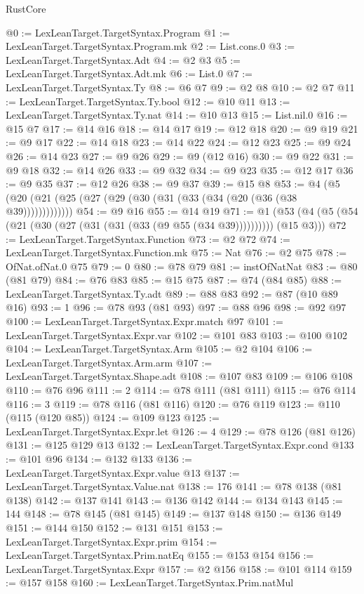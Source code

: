 \begin{lexlean}{RustCore}
\begin{coremodule}
@0 := LexLeanTarget.TargetSyntax.Program
@1 := LexLeanTarget.TargetSyntax.Program.mk
@2 := List.cons.{0}
@3 := LexLeanTarget.TargetSyntax.Adt
@4 := @2 @3
@5 := LexLeanTarget.TargetSyntax.Adt.mk
@6 := List.{0}
@7 := LexLeanTarget.TargetSyntax.Ty
@8 := @6 @7
@9 := @2 @8
@10 := @2 @7
@11 := LexLeanTarget.TargetSyntax.Ty.bool
@12 := @10 @11
@13 := LexLeanTarget.TargetSyntax.Ty.nat
@14 := @10 @13
@15 := List.nil.{0}
@16 := @15 @7
@17 := @14 @16
@18 := @14 @17
@19 := @12 @18
@20 := @9 @19
@21 := @9 @17
@22 := @14 @18
@23 := @14 @22
@24 := @12 @23
@25 := @9 @24
@26 := @14 @23
@27 := @9 @26
@29 := @9 (@12 @16)
@30 := @9 @22
@31 := @9 @18
@32 := @14 @26
@33 := @9 @32
@34 := @9 @23
@35 := @12 @17
@36 := @9 @35
@37 := @12 @26
@38 := @9 @37
@39 := @15 @8
@53 := @4 (@5 (@20 (@21 (@25 (@27 (@29 (@30 (@31 (@33 (@34 (@20 (@36 (@38 @39)))))))))))))
@54 := @9 @16
@55 := @14 @19
@71 := @1 (@53 (@4 (@5 (@54 (@21 (@30 (@27 (@31 (@31 (@33 (@9 @55 (@34 @39)))))))))) (@15 @3)))
@72 := LexLeanTarget.TargetSyntax.Function
@73 := @2 @72
@74 := LexLeanTarget.TargetSyntax.Function.mk
@75 := Nat
@76 := @2 @75
@78 := OfNat.ofNat.{0} @75
@79 := 0
@80 := @78 @79
@81 := instOfNatNat
@83 := @80 (@81 @79)
@84 := @76 @83
@85 := @15 @75
@87 := @74 (@84 @85)
@88 := LexLeanTarget.TargetSyntax.Ty.adt
@89 := @88 @83
@92 := @87 (@10 @89 @16)
@93 := 1
@96 := @78 @93 (@81 @93)
@97 := @88 @96
@98 := @92 @97
@100 := LexLeanTarget.TargetSyntax.Expr.match @97
@101 := LexLeanTarget.TargetSyntax.Expr.var
@102 := @101 @83
@103 := @100 @102
@104 := LexLeanTarget.TargetSyntax.Arm
@105 := @2 @104
@106 := LexLeanTarget.TargetSyntax.Arm.arm
@107 := LexLeanTarget.TargetSyntax.Shape.adt
@108 := @107 @83
@109 := @106 @108
@110 := @76 @96
@111 := 2
@114 := @78 @111 (@81 @111)
@115 := @76 @114
@116 := 3
@119 := @78 @116 (@81 @116)
@120 := @76 @119
@123 := @110 (@115 (@120 @85))
@124 := @109 @123
@125 := LexLeanTarget.TargetSyntax.Expr.let
@126 := 4
@129 := @78 @126 (@81 @126)
@131 := @125 @129 @13
@132 := LexLeanTarget.TargetSyntax.Expr.cond
@133 := @101 @96
@134 := @132 @133
@136 := LexLeanTarget.TargetSyntax.Expr.value @13
@137 := LexLeanTarget.TargetSyntax.Value.nat
@138 := 176
@141 := @78 @138 (@81 @138)
@142 := @137 @141
@143 := @136 @142
@144 := @134 @143
@145 := 144
@148 := @78 @145 (@81 @145)
@149 := @137 @148
@150 := @136 @149
@151 := @144 @150
@152 := @131 @151
@153 := LexLeanTarget.TargetSyntax.Expr.prim
@154 := LexLeanTarget.TargetSyntax.Prim.natEq
@155 := @153 @154
@156 := LexLeanTarget.TargetSyntax.Expr
@157 := @2 @156
@158 := @101 @114
@159 := @157 @158
@160 := LexLeanTarget.TargetSyntax.Prim.natMul

\end{coremodule}
\end{lexlean}
